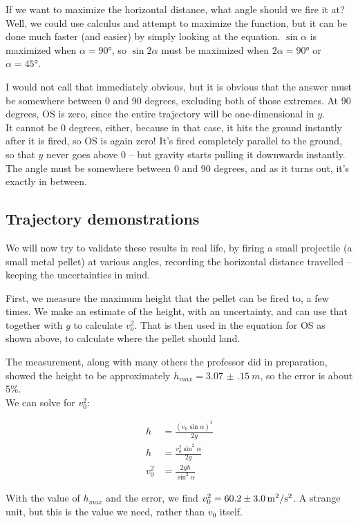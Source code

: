 \documentclass[12pt,a4paper]{report}
\begin{document}
If we want to maximize the horizontal distance, what angle should we fire it at? Well, we could use calculus and attempt to maximize the function, but it can be done much faster (and easier) by simply looking at the equation. $\sin \alpha$ is maximized when $\alpha = \ang{90}$, so $\sin 2\alpha$ must be maximized when $2\alpha = \ang{90}$ or $\alpha = \ang{45}$.

I would not call that immediately obvious, but it is obvious that the answer must be somewhere between 0 and 90 degrees, excluding both of those extremes. At 90 degrees, OS is zero, since the entire trajectory will be one-dimensional in $y$.\\
It cannot be 0 degrees, either, because in that case, it hits the ground instantly after it is fired, so OS is again zero! It's fired completely parallel to the ground, so that $y$ never goes above 0 -- but gravity starts pulling it downwards instantly.\\
The angle must be somewhere between 0 and 90 degrees, and as it turns out, it's exactly in between.

\subsection{Trajectory demonstrations}

We will now try to validate these results in real life, by firing a small projectile (a small metal pellet) at various angles, recording the horizontal distance travelled -- keeping the uncertainties in mind.

First, we measure the maximum height that the pellet can be fired to, a few times. We make an estimate of the height, with an uncertainty, and can use that together with $g$ to calculate $v_o^2$. That is then used in the equation for OS as shown above, to calculate where the pellet should land.

The measurement, along with many others the professor did in preparation, showed the height to be approximately $h_{max} = \SI{3.07(15)}{m}$, so the error is about 5\%.\\
We can solve for $v_0^2$:

\begin{align}
h &= \frac{(v_0 \sin \alpha)^2}{2g}\\
h &= \frac{v_0^2 \sin^2 \alpha}{2g}\\
v_0^2 &= \frac{2gh}{\sin^2 \alpha}
\end{align}

With the value of $h_{max}$ and the error, we find $v_0^2 = \SI{60.2 \pm 3}{m^2/s^2}$. A strange unit, but this is the value we need, rather than $v_0$ itself.
\end{document}
